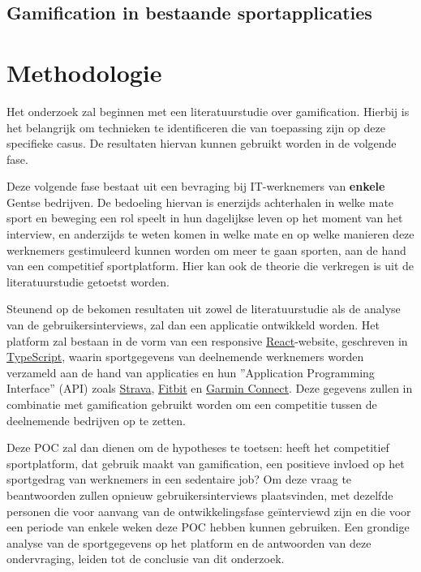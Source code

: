 \subsection{Gamification in bestaande sportapplicaties}




\section{Methodologie}%
\label{sec:methodologie}

Het onderzoek zal beginnen met een literatuurstudie over gamification. Hierbij is het belangrijk om technieken te identificeren die van toepassing zijn op deze specifieke casus. De resultaten hiervan kunnen gebruikt worden in de volgende fase.

Deze volgende fase bestaat uit een bevraging bij IT-werknemers van \textbf{enkele} Gentse bedrijven. De bedoeling hiervan is enerzijds achterhalen in welke mate sport en beweging een rol speelt in hun dagelijkse leven op het moment van het interview, en anderzijds te weten komen in welke mate en op welke manieren deze werknemers gestimuleerd kunnen worden om meer te gaan sporten, aan de hand van een competitief sportplatform. Hier kan ook de theorie die verkregen is uit de literatuurstudie getoetst worden.

Steunend op de bekomen resultaten uit zowel de literatuurstudie als de analyse van de gebruikersinterviews, zal dan een applicatie ontwikkeld worden. Het platform zal bestaan in de vorm van een responsive \href{https://react.dev/}{React}-website, geschreven in \href{https://www.typescriptlang.org/}{TypeScript}, waarin sportgegevens van deelnemende werknemers worden verzameld aan de hand van applicaties en hun ''Application Programming Interface'' (API) zoals \href{https://developers.strava.com/}{Strava}, \href{https://dev.fitbit.com/}{Fitbit} en \href{https://developer.garmin.com/gc-developer-program/overview/}{Garmin Connect}. Deze gegevens zullen in combinatie met gamification gebruikt worden om een competitie tussen de deelnemende bedrijven op te zetten.

Deze POC zal dan dienen om de hypotheses te toetsen: heeft het competitief sportplatform, dat gebruik maakt van gamification, een positieve invloed op het sportgedrag van werknemers in een sedentaire job? Om deze vraag te beantwoorden zullen opnieuw gebruikersinterviews plaatsvinden, met dezelfde personen die voor aanvang van de ontwikkelingsfase geïnterviewd zijn en die voor een periode van enkele weken deze POC hebben kunnen gebruiken. Een grondige analyse van de sportgegevens op het platform en de antwoorden van deze ondervraging, leiden tot de conclusie van dit onderzoek.

